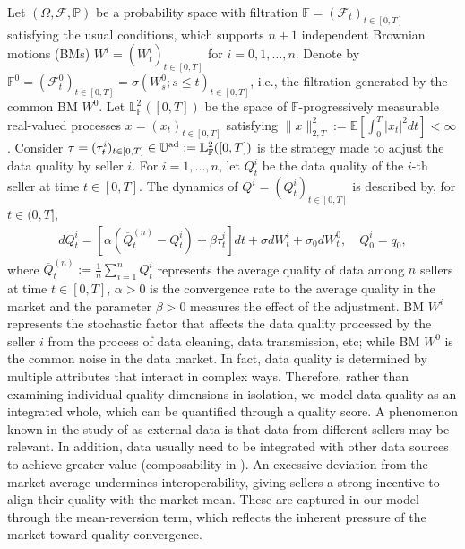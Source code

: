 \documentclass[11pt]{article}
\numberwithin{equation}{section}
\begin{document}
Let $ (\Omega, \mathcal{F}, \mathbb{P}) $ be a probability space with filtration $ \mathbb{F} = (\mathcal{F}_t)_{t \in[0,T]} $ satisfying the usual conditions, which supports $n+1$ independent Brownian motions (BMs) $ W^i = (W_t^i)_{t \in[0,T]}$ for $ i = 0,1, \ldots, n$.  Denote by $\mathbb{F}^0=(\mathcal{F}_t^0)_{t\in [0,T]}=\sigma(W_s^0; s\leq t)_{t\in [0, T]}$, i.e., the filtration generated by the common BM $W^0$. %
Let $\mathbb{L}_{\mathbb{F}}^2([0,T])$ be the space of $\mathbb{F}$-progressively measurable real-valued processes $x=(x_t)_{t\in[0,T]}$ satisfying $\|x\|_{2,T}^2:=\mathbb{E} [\int_0^T|x_t|^2 dt] < \infty$. Consider $\tau=(\tau_t^i)_{t\in[0,T]}\in\mathbb{U}^{\rm ad}:=\mathbb{L}_{\mathbb{F}}^2([0,T])$ is the strategy made to adjust the data quality by seller $i$. For $i=1,\ldots,n$, let $Q_t^i$ be the data quality of the $i$-th seller at time $t\in [0,T]$. The dynamics of $Q^i=(Q_t^i)_{t\in[0,T]}$  is described by, for $t\in(0,T]$,
	\begin{align}\label{dq}
		d Q_t^i=\left[\alpha\left(\overline{Q}_t^{(n)}-Q_t^i\right)+\beta \tau_t^i\right]dt+\sigma  d W_t^i+\sigma_0dW_t^0, \quad Q_0^i=q_0, 
	\end{align}
where $\overline{Q}_t^{(n)}:=\frac{1}{n}\sum_{i=1}^nQ_t^i$ represents the average quality of data among $n$ sellers at time $t\in[0,T]$, $\alpha>0$ is the convergence rate to the average quality in the market and the parameter $\beta>0$ measures the effect of the adjustment. BM $W^i$ represents the stochastic factor that affects the data quality processed by the seller $i$ from the process of data cleaning, data transmission, etc; while BM $W^0$ is the common noise in the data market.  In fact, data quality is determined by multiple attributes that interact in complex ways. Therefore, rather than examining individual quality dimensions in isolation, we model data quality as an integrated whole, which can be quantified through a quality score. A phenomenon known in the study of \cite{AM22} as external data is that data from different sellers may be relevant. In addition, data usually need to be integrated with other data sources to achieve greater value (composability in \cite{BW24}). An excessive deviation from the market average undermines interoperability, giving sellers a strong incentive to align their quality with the market mean. These are captured in our model through the mean-reversion term, which reflects the inherent pressure of the market toward quality convergence.
\end{document}
